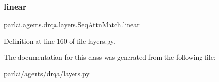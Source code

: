 \subsubsection{\texorpdfstring{linear}{linear}}
{\footnotesize\ttfamily parlai.\+agents.\+drqa.\+layers.\+Seq\+Attn\+Match.\+linear}



Definition at line 160 of file layers.\+py.



The documentation for this class was generated from the following file\+:\begin{DoxyCompactItemize}
\item 
parlai/agents/drqa/\hyperlink{layers_8py}{layers.\+py}\end{DoxyCompactItemize}
